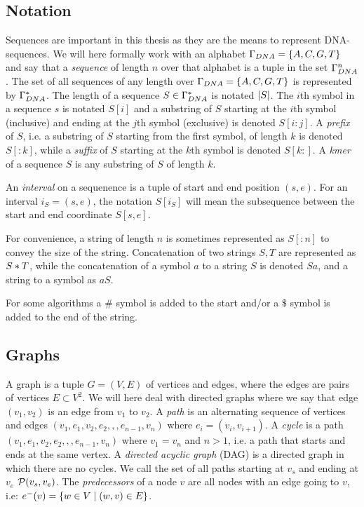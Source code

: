 \subsection{Notation}
Sequences are important in this thesis as they are the means to represent DNA-sequences. We will here formally work with an alphabet $\Gamma_{DNA} = \left\{A, C, G, T\right\}$ and say that a \emph{sequence} of length $n$ over that alphabet is a tuple in the set $\Gamma_{DNA}^n$.
The set of all sequences of any length over $\Gamma_{DNA} = \left\{A, C, G, T\right\}$ is  represented by $\Gamma_{DNA}^*$.
The length of a sequence $S \in \Gamma_{DNA}^*$ is notated $\left|S\right|$.
The $i$th symbol in a sequence $s$ is notated $S[i]$ and a substring of $S$ starting at the $i$th symbol (inclusive) and ending at the $j$th symbol (exclusive) is denoted $S[i:j]$.
A \emph{prefix} of $S$, i.e. a substring of $S$ starting from the first symbol, of length $k$ is denoted $S[:k]$, while a \emph{suffix} of $S$ starting at the $k$th symbol is denoted $S[k:]$. A \emph{kmer} of a sequence $S$ is any substring of $S$ of length $k$.

An \emph{interval} on a sequenence is a tuple of start and end position $(s, e)$. For an interval $i_S=(s, e)$, the notation $S[i_S]$ will mean the subsequence between the start and end coordinate $S[s, e]$.

For convenience, a string of length $n$ is sometimes represented as $S[:n]$ to convey the size of the string.
Concatenation of two strings $S, T$ are represented as $S * T$, while the concatenation of a symbol $a$ to a string $S$ is denoted $Sa$, and a string to a symbol as $aS$.

For some algorithms a $\#$ symbol is added to the start and/or a $\$$ symbol is added to the end of the string.

\subsection{Graphs}
A graph is a tuple $G=(V, E)$ of vertices and edges, where the edges are pairs of vertices $E \subset V^2$.
We will here deal with directed graphs where we say that edge $(v_1, v_2)$ is an edge from $v_1$ to $v_2$.
A \emph{path} is an alternating sequence of vertices and edges $(v_1, e_1, v_2, e_2,,,e_{n-1}, v_n)$ where $e_i = (v_i, v_{i+1})$.
A \emph{cycle} is a path $(v_1, e_1, v_2, e_2,,,e_{n-1}, v_n)$ where $v_1=v_n$ and $n>1$, i.e. a path that starts and ends at the same vertex.
A \emph{directed acyclic graph} (DAG) is a directed graph in which there are no cycles.
We call the set of all paths starting at $v_s$ and ending at $v_e$ $\mathcal{P}(v_s, v_e)$. The \emph{predecessors} of a node $v$ are all nodes with an edge going to $v$, i.e: $e^-(v) = \left\{w \in V \mid (w, v) \in E\right\}$.

